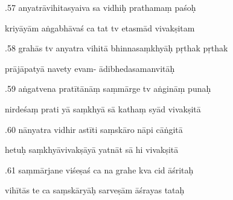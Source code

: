 \documentclass[article,12pt,a4paper]{memoir}%
\newcounter{parCount}
\begin{document}
	  
	  \pstart {}.57 anyatrāvihitasyaiva sa vidhiḥ prathamaṃ paśoḥ 
	{}
	\pend%
      

	  
	  \pstart \leavevmode%
	kriyāyām aṅgabhāvaś ca tat tv etasmād vivakṣitam 
	{}
	\pend%
      

	  
	  \pstart {}.58 grahās tv anyatra vihitā bhinnasaṃkhyāḥ pṛthak pṛthak 
	{}
	\pend%
      

	  
	  \pstart \leavevmode%
	prājāpatyā navety evam- ādibhedasamanvitāḥ 
	{}
	\pend%
      

	  
	  \pstart {}.59 aṅgatvena pratītānāṃ saṃmārge tv aṅgināṃ punaḥ 
	{}
	\pend%
      

	  
	  \pstart \leavevmode%
	nirdeśaṃ prati yā saṃkhyā sā kathaṃ syād vivakṣitā 
	{}
	\pend%
      

	  
	  \pstart {}.60 nānyatra vidhir astīti saṃskāro nāpi cāṅgitā 
	{}
	\pend%
      

	  
	  \pstart \leavevmode%
	hetuḥ saṃkhyāvivakṣāyā yatnāt sā hi vivakṣitā 
	{}
	\pend%
      

	  
	  \pstart {}.61 saṃmārjane viśeṣaś ca na grahe kva cid āśritaḥ 
	{}
	\pend%
      

	  
	  \pstart \leavevmode%
	vihītās te ca saṃskāryāḥ sarveṣām āśrayas tataḥ 
	{}
	\pend%
      
\end{document}

